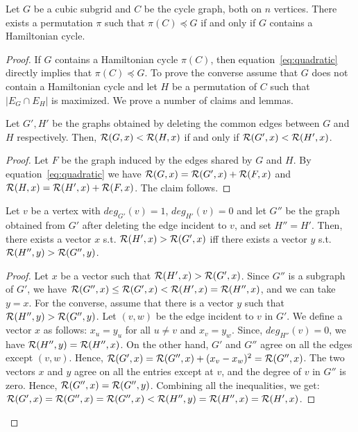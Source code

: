 \begin{theorem}\label{thm:hamiltonian_spectral}
Let $G$ be a cubic subgrid and $C$ be the cycle graph, both on $n$ vertices. There exists
a permutation $\pi$ such that $\pi(C) \preceq G$ if and only if $G$ contains a Hamiltonian cycle. 
\end{theorem}
\begin{proof}  If $G$ contains a Hamiltonian cycle $\pi(C)$, then equation~\ref{eq:quadratic} directly implies that $\pi(C)\preceq G$.  To prove the converse  assume that $G$ does not contain a Hamiltonian cycle and let $H$ be a permutation of $C$ such that $|E_G\cap E_H|$ is maximized. We prove a number of claims and lemmas. 
	

\begin{claim}\label{claim:deleting_shared_edges}
Let $G', H'$ be the graphs obtained by deleting the common edges between $G$ and $H$ respectively. Then, ${\cal R}(G,x)< {\cal R}(H,x)$ if and only if ${\cal R}(G',x) < {\cal R}(H',x)$.
\end{claim}

\begin{proof}
Let $F$ be the graph induced by the edges shared by $G$ and $H$. By equation~\ref{eq:quadratic} we have
${\cal R}(G,x) = {\cal R}(G',x)+ {\cal R}(F,x)$ and $ {\cal R}(H,x) = {\cal R}(H',x)+ {\cal R}(F,x)$. The claim follows.
\end{proof}

\begin{claim}\label{claim:deleting_degree_1_edge}
Let $v$ be a vertex with $deg_{G'}(v)=1$, $deg_{H'}(v)=0$ and let $G''$ be the graph obtained from $G'$ after deleting the edge incident to $v$, and set $H''=H'$. Then, there exists a vector $x$ s.t. ${\cal R}(H',x)>{\cal R}(G',x)$ iff there exists a vector $y$ s.t. ${\cal R}(H'',y)>{\cal R}(G'',y)$.
\end{claim}
\begin{proof}
Let $x$ be a vector such that ${\cal R}(H',x)>{\cal R}(G',x)$. Since $G''$ is a subgraph of $G'$, we have ${\cal R}(G'',x) \leq {\cal R}(G',x) < {\cal R}(H',x) = {\cal R}(H'',x) $, and we can take $y =x$. For the converse, assume that there is a vector $y$ such that ${\cal R}(H'',y)>{\cal R}(G'',y)$. Let $(v,w)$ be the edge incident to $v$ in $G'$. We define a vector $x$ as follows: $x_{u} = y_u$ for all $u \neq v$ and $x_v = y_w$. Since, $deg_{H''}(v) = 0$, we have 
${\cal R}(H'',y) = {\cal R}(H'',x)$. On the other hand,  $G'$ and $G''$ agree on all the edges except $(v,w)$. Hence, 
${\cal R}(G',x) = {\cal R}(G'',x) + (x_v - x_w)^2 = {\cal R}(G'',x) $. The two vectors $x$ and $y$ agree on all the entries except at $v$, and the degree of $v$ in $G''$ is zero. Hence, ${\cal R}(G'',x) = {\cal R}(G'',y)$. Combining all the inequalities, we get: \\
$ {\cal R}(G',x)= {\cal R}(G'',x) = {\cal R}(G'',x) < {\cal R}(H'',y) = {\cal R}(H'',x) = {\cal R}(H',x)$.
\end{proof}



\end{proof}
